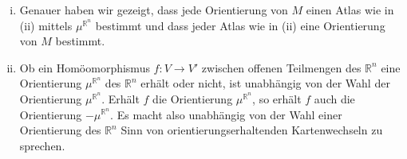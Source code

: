 \begin{bemerkung}[{name=[{zu \autoref{satz:orientierbar_atlas}}]}]
	\leavevmode
	\begin{enumerate}[i)]
		\item Genauer haben wir gezeigt, dass jede Orientierung von $M$ einen Atlas wie in (ii) mittels $\mu^{\mathbb{R}^n}$ bestimmt und dass jeder Atlas wie in (ii) eine Orientierung von $M$ bestimmt.
		\item Ob ein Homöomorphismus $f \colon V \to V'$ zwischen offenen Teilmengen des $\mathbb{R}^n$ eine Orientierung $\mu^{\mathbb{R}^n}$ des $\mathbb{R}^n$ erhält oder nicht, ist unabhängig von der Wahl der Orientierung $\mu^{\mathbb{R}^n}$.
		Erhält $f$ die Orientierung $\mu^{\mathbb{R}^n}$, so erhält $f$ auch die Orientierung $-\mu^{\mathbb{R}^n}$.
		Es macht also unabhängig von der Wahl einer Orientierung des $\mathbb{R}^n$ Sinn von orientierungserhaltenden Kartenwechseln zu sprechen.
	\end{enumerate}
\end{bemerkung}

